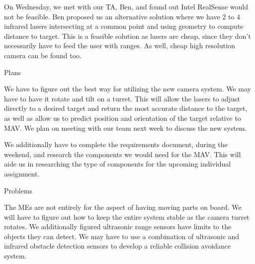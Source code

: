\documentclass[onecolumn, oneside, letterpaper, draftclsnofoot, 10pt, compsoc]{IEEEtran}
\begin{document}
On Wednesday, we met with our TA, Ben, and found out Intel RealSense would not be feasible. Ben proposed us an alternative solution where we have 2 to 4 infrared lasers intersecting at a common point and using geometry to compute distance to target. This is a feasible solution as lasers are cheap, since they don't necessarily have to feed the user with ranges. As well, cheap high resolution camera can be found too.

Plans

We have to figure out the best way for utilizing the new camera system. We may have to have it rotate and tilt on a turret. This will allow the lasers to adjust directly to a desired target and return the most accurate distance to the target, as well as allow us to predict position and orientation of the target relative to MAV. We plan on meeting with our team next week to discuss the new system.

We additionally have to complete the requirements document, during the weekend, and research the components we would need for the MAV. This will aide us in researching the type of components for the upcoming individual assignment.

Problems

The MEs are not entirely for the aspect of having moving parts on board. We will have to figure out how to keep the entire system stable as the camera turret rotates. We additionally figured ultrasonic range sensors have limits to the objects they can detect. We may have to use a combination of ultrasonic and infrared obstacle detection sensors to develop a reliable collision avoidance system.
\end{document}
